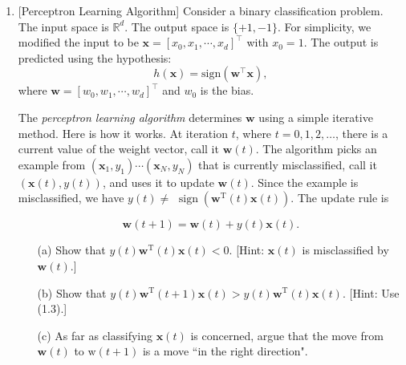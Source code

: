 \documentclass[10pt]{article}
\begin{document}
\begin{enumerate}[1.]
(a)




(b)\\
(1)




(2)




(3)




(4)




(5)









        \newpage

	\item {} [Perceptron Learning Algorithm]
            Consider a binary classification problem. The input space is $\mathbb{R}^{d}$. The output space is $\{ +1, -1 \}$. For simplicity, we modified the input to be $\mathbf{x} = [x_0, x_1, \cdots, x_d]^{\intercal}$ with $x_0=1$. The output is predicted using the hypothesis:
            \begin{equation}
                h(\mathbf{x}) = \text{sign}(\mathbf{w}^{\intercal}\mathbf{x}),
            \end{equation}
            where $\mathbf{w} = [w_0, w_1, \cdots, w_d]^{\intercal}$ and $w_0$ is the bias.
            
            The \textit{perceptron learning algorithm} determines $\mathbf{w}$ using a simple iterative method. Here is how it works. At iteration $t$, where $t=0,1,2, \ldots$, there is a current value of the weight vector, call it $\mathbf{w}(t)$. The algorithm picks an example from $\left(\mathbf{x}_1, y_1\right) \cdots\left(\mathbf{x}_N, y_N\right)$ that is currently misclassified, call it $(\mathbf{x}(t), y(t))$, and uses it to update $\mathbf{w}(t)$. Since the example is misclassified, we have $y(t) \neq$ $\operatorname{sign}\left(\mathbf{w}^{\mathrm{T}}(t) \mathbf{x}(t)\right)$. The update rule is

            \begin{equation}
                \mathbf{w}(t+1)=\mathbf{w}(t)+y(t) \mathbf{x}(t).    
            \end{equation}

                
		\begin{itemize}
			\item[(a)] Show that $y(t) \mathbf{w}^{\mathrm{T}}(t) \mathbf{x}(t)<0$. [Hint: $\mathbf{x}(t)$ is misclassified by $\mathbf{w}(t)$.]~ 
			\item[(b)] Show that $y(t) \mathbf{w}^{\mathrm{T}}(t+1) \mathbf{x}(t)>y(t) \mathbf{w}^{\mathrm{T}}(t) \mathbf{x}(t)$. [Hint: Use (1.3).]~ 
			\item[(c)]   As far as classifying $\mathbf{x}(t)$ is concerned, argue that the move from $\mathbf{w}(t)$ to $\mathrm{w}(t+1)$ is a move ``in the right direction".~ 
		\end{itemize}


\end{enumerate}
\end{document}

